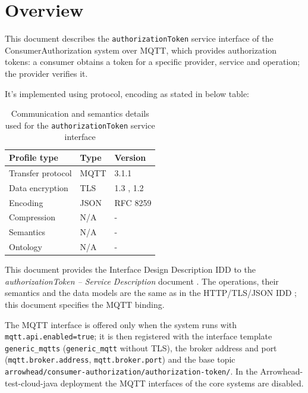 \documentclass[a4paper]{arrowhead}
\begin{document}
\section{Overview}
\label{sec:overview}

This document describes the \texttt{authorizationToken} service interface of the ConsumerAuthorization system over MQTT, which provides authorization tokens: a consumer obtains a token for a specific provider, service and operation; the provider verifies it.

It's implemented using protocol, encoding as stated in below table:
\begin{table}[ht!]
  \centering
  \begin{tabular}{|l|l|l|}
    \hline
    \rowcolor{gray!33} Profile type & Type & Version \\ \hline
    Transfer protocol & MQTT & 3.1.1 \cite{mqtt311} \\ \hline
    Data encryption & TLS & 1.3 \cite{rfc8446}, 1.2 \cite{rfc5246} \\ \hline
    Encoding & JSON & RFC 8259 \cite{rfc8259} \\ \hline
    Compression & N/A & - \\ \hline
    Semantics & N/A & - \\ \hline
    Ontology & N/A & - \\ \hline
  \end{tabular}
  \caption{Communication and semantics details used for the \texttt{authorizationToken} service interface}
  \label{tab:comunication_semantics_profile}
\end{table}

This document provides the Interface Design Description IDD to the \textit{authorizationToken -- Service Description} document \cite{ca-authorizationToken-sd}.
The operations, their semantics and the data models are the same as in the HTTP/TLS/JSON IDD \cite{ca-authorizationToken-http-idd}; this document specifies the MQTT binding.

The MQTT interface is offered only when the system runs with \texttt{mqtt.api.enabled=true}; it is then registered with the interface template \texttt{generic\_\allowbreak{}mqtts} (\texttt{generic\_\allowbreak{}mqtt} without TLS), the broker address and port (\texttt{mqtt.\allowbreak{}broker.\allowbreak{}address}, \texttt{mqtt.\allowbreak{}broker.\allowbreak{}port}) and the base topic \texttt{arrowhead/\allowbreak{}consumer-\allowbreak{}authorization/\allowbreak{}authorization-\allowbreak{}token/\allowbreak{}}. In the Arrowhead-test-cloud-java deployment the MQTT interfaces of the core systems are disabled.
\end{document}
